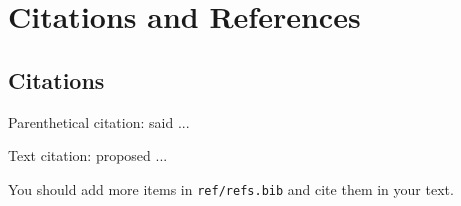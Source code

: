 
\chapter{Citations and References}

\section{Citations}

Parenthetical citation: \citep{mellinger1996laser} said ...

Text citation: \citet{dupont1974bone} proposed ...

You should add more items in \texttt{ref/refs.bib} and cite them in your text.
